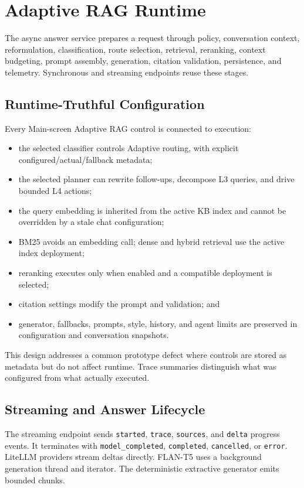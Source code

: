 \section{Adaptive RAG Runtime}

The async answer service prepares a request through policy, conversation
context, reformulation, classification, route selection, retrieval, reranking,
context budgeting, prompt assembly, generation, citation validation,
persistence, and telemetry. Synchronous and streaming endpoints reuse these
stages.

\subsection{Runtime-Truthful Configuration}

Every Main-screen Adaptive RAG control is connected to execution:

\begin{itemize}
  \item the selected classifier controls Adaptive routing, with explicit
  configured/actual/fallback metadata;
  \item the selected planner can rewrite follow-ups, decompose L3 queries, and
  drive bounded L4 actions;
  \item the query embedding is inherited from the active KB index and cannot be
  overridden by a stale chat configuration;
  \item BM25 avoids an embedding call; dense and hybrid retrieval use the
  active index deployment;
  \item reranking executes only when enabled and a compatible deployment is
  selected;
  \item citation settings modify the prompt and validation; and
  \item generator, fallbacks, prompts, style, history, and agent limits are
  preserved in configuration and conversation snapshots.
\end{itemize}

This design addresses a common prototype defect where controls are stored as
metadata but do not affect runtime. Trace summaries distinguish what was
configured from what actually executed.

\subsection{Streaming and Answer Lifecycle}

The streaming endpoint sends \texttt{started}, \texttt{trace},
\texttt{sources}, and \texttt{delta} progress events. It terminates with
\texttt{model\_completed}, \texttt{completed}, \texttt{cancelled}, or
\texttt{error}. LiteLLM
providers stream deltas directly. FLAN-T5 uses a background generation thread
and iterator. The deterministic extractive generator emits bounded chunks.

